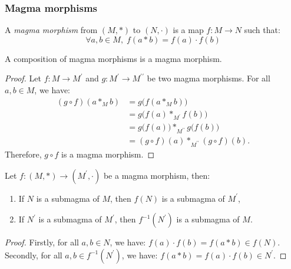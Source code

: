 \documentclass[12pt]{report}
\begin{document}
\subsubsection{Magma morphisms}

\begin{definition} \label{def-magma-morphism}
    A \emph{magma morphism} from $(M, \ast)$ to $(N, \cdot)$ is a map $f \colon M \to N$ such that:
    \[
        \forall a, b \in M, \; f(a \ast b) = f(a) \cdot f(b)
    \]
\end{definition}

\begin{proposition} \label{prop-magma-morphism-composition}
    A composition of magma morphisms is a magma morphism.
\end{proposition}

\begin{proof}
    Let $f \colon M \to M^{\prime}$ and $g \colon M^{\prime} \to M^{\prime \prime}$ be two magma morphisms. For all $a, b \in M$, we have:
    \[
        \begin{aligned}
            (g \circ f)(a \ast_{M} b)
                &= g\big( f(a \ast_{M} b) \big) \\
                &= g\big( f(a) \ast_{M^{\prime}} f(b) \big) \\
                &= g\big( f(a) \big) \ast_{M^{\prime \prime}} g\big( f(b) \big) \\
                &= (g \circ f)(a) \ast_{M^{\prime \prime}} (g \circ f)(b).
        \end{aligned}
    \]
    Therefore, $g \circ f$ is a magma morphism.
\end{proof}

\begin{theorem} \label{thm-magma-morphism-image}
    Let $f \colon (M, \ast) \to (M^{\prime}, \cdot)$ be a magma morphism, then:
    \begin{enumerate}[label=(\roman*)]
        \item If $N$ is a submagma of $M$, then $f(N)$ is a submagma of $M^{\prime}$,
        \item If $N^{\prime}$ is a submagma of $M^{\prime}$, then $f^{-1}(N^{\prime})$ is a submagma of $M$.
    \end{enumerate}
\end{theorem}

\begin{proof}
    Firstly, for all $a, b \in N$, we have: $f(a) \cdot f(b) = f(a \ast b) \in f(N)$. Secondly, for all $a, b \in f^{-1}(N^{\prime})$, we have: $f(a \ast b) = f(a) \cdot f(b) \in N^{\prime}$.
\end{proof}
\end{document}
